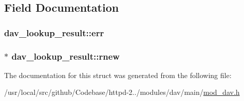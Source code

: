 \subsection{Field Documentation}
\subsubsection[{\texorpdfstring{err}{err}}]{ dav\+\_\+lookup\+\_\+result\+::err}\hypertarget{structdav__lookup__result_a28f31e5bff1099045dba379393d931a1}{}\label{structdav__lookup__result_a28f31e5bff1099045dba379393d931a1}
\subsubsection[{\texorpdfstring{rnew}{rnew}}]{$\ast$ dav\+\_\+lookup\+\_\+result\+::rnew}\hypertarget{structdav__lookup__result_a227eca16f8f08e0ce7c49e3706e70160}{}\label{structdav__lookup__result_a227eca16f8f08e0ce7c49e3706e70160}


The documentation for this struct was generated from the following file\+:\begin{DoxyCompactItemize}
\item 
/usr/local/src/github/\+Codebase/httpd-\/2../modules/dav/main/\hyperlink{mod__dav_8h}{mod\+\_\+dav.\+h}\end{DoxyCompactItemize}
